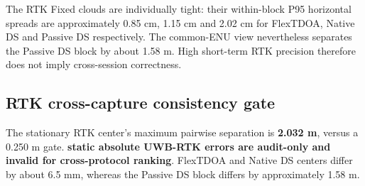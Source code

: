 \documentclass[10pt,a4paper]{article}
\begin{document}
The RTK Fixed clouds are individually tight: their within-block P95 horizontal
spreads are approximately 0.85 cm, 1.15 cm and 2.02 cm for FlexTDOA, Native DS
and Passive DS respectively. The common-ENU view nevertheless separates the
Passive DS block by about 1.58 m. High short-term RTK precision therefore does
not imply cross-session correctness.

\subsection{RTK cross-capture consistency gate}
The stationary RTK center's maximum pairwise separation is \textbf{2.032 m}, versus a 0.250 m gate. \textbf{static absolute UWB-RTK errors are audit-only and invalid for cross-protocol ranking}. FlexTDOA and Native DS centers differ by about 6.5 mm, whereas the Passive DS block differs by approximately 1.58 m.
\end{document}

